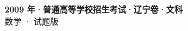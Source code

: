 \documentclass[zihao=-4, a4paper]{ctexart}
\begin{document}
\begin{center}
  {\Large\bfseries 2009 年·普通高等学校招生考试·辽宁卷·文科}\\[4pt]
  {\large 数学 · 试题版}
\end{center}
\medskip
{}

\end{document}
